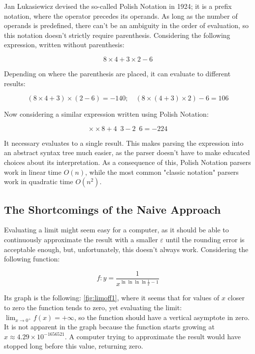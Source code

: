 \documentclass{article}
\theoremstyle{plain}
\theoremstyle{definition}
\theoremstyle{algorithm}
\begin{document}
	Jan Lukasiewicz devised the so-called Polish Notation \cite{wiki:polish} in 1924; it is a prefix notation, where the operator precedes its operands.
	As long as the number of operands is predefined, there can't be an ambiguity in the order of evaluation, so this notation doesn't strictly require parenthesis.
	Considering the following expression, written without parenthesis:
	
	\[
	8 \times 4 + 3 \times  2 - 6
	\]
	
	Depending on where the parenthesis are placed, it can evaluate to different results:
	
	\[
	(8 \times 4 + 3) \times (2 - 6) = -140; \quad (8 \times (4 + 3) \times 2) - 6 = 106 
	\]
	
	Now considering a similar expression written using Polish Notation:
	
	\[
	\times \times 8 + 4 \enspace 3 - 2 \enspace 6 = -224
	\]
	
	It necessary evaluates to a single result.
	This makes parsing the expression into an abstract syntax tree \cite{wiki:abtree} much easier, as the parser doesn't have to make educated choices about its interpretation. As a consequence of this, Polish Notation parsers work in linear time \(O(n)\), while the most common "classic notation" parsers work in quadratic time \(O(n^{2})\).
	
	\subsection{The Shortcomings of the Naive Approach}
	
	Evaluating a limit might seem easy for a computer, as it should be able to continuously approximate the result with a smaller $\varepsilon$ until the rounding error is acceptable enough, but, unfortunately, this doesn't always work.
	Considering the following function:
	
	\[
	f : y = \frac{1}{x^{\ln{\ln{\ln{\ln{\frac{1}{x}}}}}-1}} \tag{1} \label{eq:toinfinity}
	\]
	
	Its graph is the following: \cref{fig:limoff1}, where it seems that for values of \(x\) closer to zero the function tends to zero, yet evaluating the limit: \(\lim_{x \to 0^{+}}{f(x) = +\infty}\), so the function should have a vertical asymptote in zero. It is not apparent in the graph because the function starts growing at \(x \approx 4.29 \times 10 ^{-1656521}\). A computer trying to approximate the result would have stopped long before this value, returning zero.
	
\end{document}
